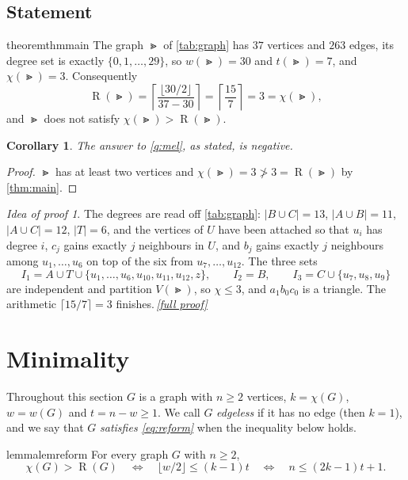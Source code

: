\documentclass[11pt,a4paper]{article}
\theoremstyle{plain}
\newtheorem{corollary}[theorem]{Corollary}
\theoremstyle{definition}
\theoremstyle{remark}
\newtheorem*{proofidea}{Idea of proof}
\newcommand{\fullproofref}[1]{\,\hyperref[#1]{\textit{[full proof]}}}
\newcommand{\fl}[1]{\lfloor #1\rfloor}
\newcommand{\ce}[1]{\lceil #1\rceil}
\newcommand{\RHS}{\operatorname{R}}
\begin{document}
\subsection{Statement}

\begin{restatable}{theorem}{thmmain}\label{thm:main}
The graph $\Gt$ of \cref{tab:graph} has $37$ vertices and $263$ edges, its degree set is exactly $\{0,1,\dots,29\}$, so $w(\Gt)=30$ and $t(\Gt)=7$, and $\chi(\Gt)=3$. Consequently
\[
\RHS(\Gt)=\left\lceil\frac{\fl{30/2}}{37-30}\right\rceil=\left\lceil\frac{15}{7}\right\rceil=3=\chi(\Gt),
\]
and $\Gt$ does not satisfy $\chi(\Gt)>\RHS(\Gt)$.
\end{restatable}

\begin{corollary}\label{cor:answer}
The answer to \cref{q:mel}, as stated, is negative.
\end{corollary}

\begin{proof}
$\Gt$ has at least two vertices and $\chi(\Gt)=3\not>3=\RHS(\Gt)$ by \cref{thm:main}.
\end{proof}

\begin{proofidea}
The degrees are read off \cref{tab:graph}: $|B\cup C|=13$, $|A\cup B|=11$, $|A\cup C|=12$, $|T|=6$, and the vertices of $U$ have been attached so that $u_i$ has degree $i$, $c_j$ gains exactly $j$ neighbours in $U$, and $b_j$ gains exactly $j$ neighbours among $u_1,\dots,u_6$ on top of the six from $u_7,\dots,u_{12}$. The three sets
\[
I_1=A\cup T\cup\{u_1,\dots,u_6,u_{10},u_{11},u_{12},z\},\qquad I_2=B,\qquad I_3=C\cup\{u_7,u_8,u_9\}
\]
are independent and partition $V(\Gt)$, so $\chi\le3$, and $a_1b_0c_0$ is a triangle. The arithmetic $\ce{15/7}=3$ finishes.\fullproofref{pf:main}
\end{proofidea}

\section{Minimality}\label{sec:minimality}

Throughout this section $G$ is a graph with $n\ge2$ vertices, $k=\chi(G)$, $w=w(G)$ and $t=n-w\ge1$. We call $G$ \emph{edgeless} if it has no edge (then $k=1$), and we say that $G$ \emph{satisfies \eqref{eq:reform}} when the inequality below holds.

\begin{restatable}[Reformulation]{lemma}{lemreform}\label{lem:reform}
For every graph $G$ with $n\ge2$,
\[
\chi(G)>\RHS(G)\quad\Longleftrightarrow\quad \fl{w/2}\le(k-1)t\quad\Longleftrightarrow\quad
n\le(2k-1)t+1. \tag{R}\label{eq:reform}
\]
\end{restatable}
\end{document}
